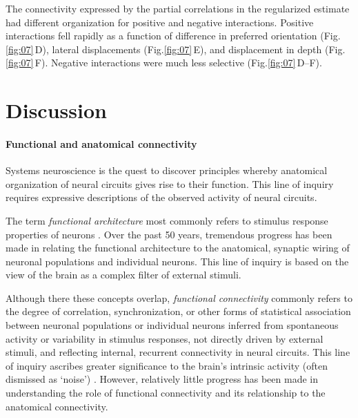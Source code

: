 \documentclass[10pt]{article}
\newcommand{\figref}[2]{Fig.\;\ref{fig:#1}\,#2}
\begin{document}
The connectivity expressed by the partial correlations in the regularized estimate had different organization for positive and negative interactions. Positive interactions fell rapidly as a function of difference in preferred orientation (\figref{07}{D}), lateral displacements (\figref{07}{E}), and displacement in depth (\figref{07}{F}). Negative interactions were much less selective (\figref{07}{D--F}).

\section*{Discussion}
\paragraph{Functional and anatomical connectivity}
Systems neuroscience is the quest to discover principles whereby anatomical organization of neural circuits gives rise to their function.  This line of inquiry requires expressive descriptions of the observed activity of neural circuits. 

The term \emph{functional architecture} most commonly refers to stimulus response properties of neurons \cite{Reid:2012}. Over the past 50 years, tremendous progress has been made in relating the functional architecture to the anatomical, synaptic wiring of neuronal populations and individual neurons.  This line of inquiry is based on the view of the brain as a complex filter of external stimuli. 

Although there these concepts overlap, \emph{functional connectivity} commonly refers to the degree of correlation, synchronization, or other forms of statistical association between neuronal populations or individual neurons inferred from spontaneous activity or variability in stimulus responses,  not directly driven by external stimuli, and reflecting internal, recurrent connectivity in neural circuits. This line of inquiry ascribes greater significance to the brain's intrinsic activity (often dismissed as `noise') \cite{Yuste:2005}. However, relatively little progress has been made in understanding the role of functional connectivity and its relationship to the anatomical connectivity.
\end{document}
